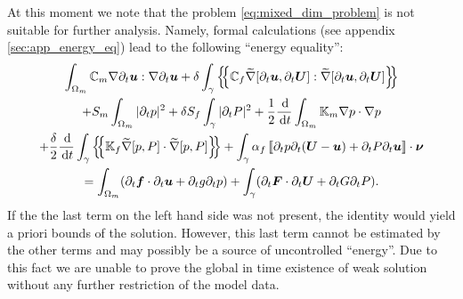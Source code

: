 \documentclass[a4paper]{article}
\def\agrad{\widetilde\nabla}
\def\avg#1{\left\{\mskip-5mu\left\{#1\right\}\mskip-5mu\right\}}
\def\CC{\tn C}
\def\d {\,{\rm d}}
\def\ddt#1{\frac{\d #1}{\d t}}
\def\dt{\prtl_t}
\def\FF{\vc F}
\def\ff{\vc f}
\def\jmp#1{\left\llbracket #1 \right\rrbracket}
\def\nnu{\vc\nu}
\def\prtl{\partial}
\def\tn#1{{\mathbb{#1}}}    %
\def\U{\vc U}
\def\uu{\vc u}
\def\vc#1{\mathbf{\boldsymbol{#1}}}     %
\newcommand{\ml}[1]{\begin{multline}#1\end{multline}}
\begin{document}
At this moment we note that the problem \eqref{eq:mixed_dim_problem} is not suitable for further analysis.
Namely, formal calculations (see appendix \ref{sec:app_energy_eq}) lead to the following ``energy equality'':
\ml{ \label{eq:apriori_biot} \int_{\Omega_m}\CC_m\nabla\dt\uu:\nabla\dt\uu + \delta\int_\gamma\avg{\CC_f\agrad[\dt\uu,\dt\U]:\agrad[\dt\uu,\dt\U]}\\
+ S_m\int_{\Omega_m}|\dt p|^2 + \delta S_f\int_\gamma|\dt P|^2
+ \frac12\ddt{}\int_{\Omega_m}\tn K_m\nabla p\cdot\nabla p\\
+ \frac\delta2\ddt{}\int_\gamma\avg{\tn K_f\agrad[p,P]\cdot\agrad[p,P]}
+ \int_\gamma\alpha_f\jmp{\dt p\dt(\U-\uu) + \dt P\dt\uu}\cdot\nnu\\
= \int_{\Omega_m}(\dt\ff\cdot\dt\uu + \dt g \dt p) + \int_\gamma(\dt\FF\cdot\dt\U + \dt G \dt P). }
If the the last term on the left hand side was not present, the identity would yield a priori bounds of the solution.
However, this last term cannot be estimated by the other terms and may possibly be a source of uncontrolled ``energy''.
Due to this fact we are unable to prove the global in time existence of weak solution without any further restriction of the model data.
\end{document}

